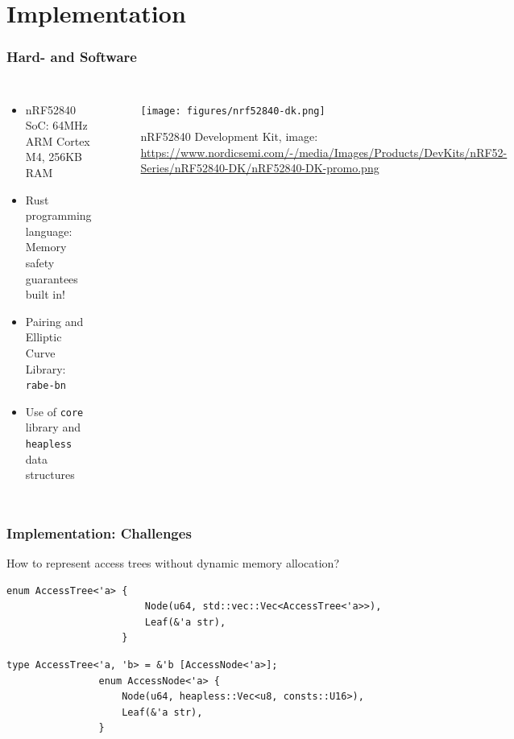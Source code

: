 \section{Implementation}

\begin{frame}[c]
    \frametitle{Hard- and Software}
    \begin{columns}[c]
        \begin{itemize}
            \item nRF52840 SoC: \textcolor{TUMBlau}{64MHz} ARM Cortex M4, \textcolor{TUMBlau}{256KB RAM}
            \item Rust programming language: Memory safety guarantees built in!
            \item Pairing and Elliptic Curve Library: \texttt{rabe-bn}\footnotemark
            \item Use of \texttt{core} library and \texttt{heapless} data structures\footnotemark
        \end{itemize}
        
        \begin{figure}
            \texttt{[image: figures/nrf52840-dk.png]}
            \caption{nRF52840 Development Kit, image: \url{https://www.nordicsemi.com/-/media/Images/Products/DevKits/nRF52-Series/nRF52840-DK/nRF52840-DK-promo.png}}
        \end{figure}
    \end{columns}
\end{frame}

\begin{frame}[c, fragile]
    \frametitle{Implementation: Challenges}
    \begin{block}{How to represent access trees without dynamic memory allocation?}
        \begin{center}
            \begin{minipage}{0.7\textwidth}
                \begin{lstlisting}[caption={Naive implementation (uses standard library)}]
                    enum AccessTree<'a> {
                        Node(u64, std::vec::Vec<AccessTree<'a>>),
                        Leaf(&'a str),
                    }
                \end{lstlisting}
            \begin{lstlisting}[caption={Refined implementation}]
                type AccessTree<'a, 'b> = &'b [AccessNode<'a>];
                enum AccessNode<'a> {
                    Node(u64, heapless::Vec<u8, consts::U16>),
                    Leaf(&'a str),
                }
                \end{lstlisting}
            \end{minipage}
        \end{center}
    \end{block}
\end{frame}

